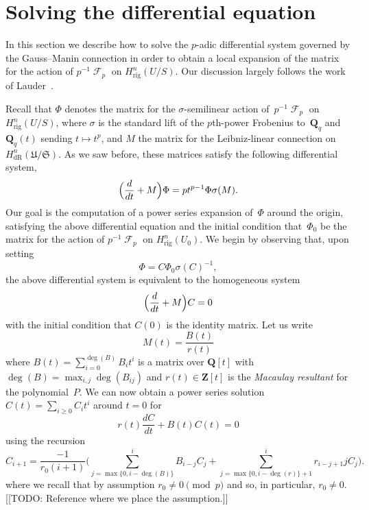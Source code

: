 \documentclass[a4paper,11pt]{article}
\numberwithin{equation}{section}
\DeclareMathOperator{\Frob}{\mathcal{F}} %
\providecommand{\HdR}{H_{\text{dR}}}    %
\providecommand{\Hrig}{H_{\text{rig}}}  %
\theoremstyle{definition}
\begin{document}

\section{Solving the differential equation}
\label{sec:DifferentialSystem}

In this section we describe how to solve the $p$-adic differential 
system governed by the Gauss--Manin connection in order to obtain 
a local expansion of the matrix for the action of $p^{-1} \Frob_p$ 
on $\Hrig^{n}(U/S)$.  Our discussion largely follows the work of 
Lauder~\citep{Lauder2006}.

Recall that $\Phi$ denotes the matrix for the $\sigma$-semilinear action 
of~$p^{-1} \Frob_p$ on $\Hrig^{n}(U/S)$, where $\sigma$ is the standard lift 
of the $p$th-power Frobenius to~$\mathbf{Q}_q$ and~$\mathbf{Q}_q(t)$ sending 
$t \mapsto t^p$, and $M$ the matrix for the Leibniz-linear connection on 
$\HdR^n(\mathfrak{U}/\mathfrak{S})$.
As we saw before, these matrices satisfy the following differential system,
\begin{equation}
\Bigl(\frac{d}{dt} + M\Bigr) \Phi = p t^{p-1} \Phi \sigma(M).
\end{equation}
Our goal is the computation of a power series expansion of~$\Phi$ around 
the origin, satisfying the above differential equation and the initial 
condition that~$\Phi_0$ be the matrix for the action of $p^{-1} \Frob_p$ 
on $\Hrig^n(U_0)$.  We begin by observing that, upon setting 
\begin{equation}
\Phi = C \Phi_0 \sigma(C)^{-1},
\end{equation}
the above differential system is equivalent to the homogeneous system 
\begin{equation} \label{eq:01-GMDE-Homogenous}
\Bigl(\frac{d}{dt} + M\Bigr) C = 0
\end{equation}
with the initial condition that $C(0)$ is the identity matrix.  Let us write 
\begin{equation}
M(t) = \frac{B(t)}{r(t)}
\end{equation}
where $B(t) = \sum_{i=0}^{\deg(B)} B_i t^i$ is a matrix over $\mathbf{Q}[t]$ 
with $\deg(B) = \max_{i,j} \deg(B_{ij})$ and $r(t) \in \mathbf{Z}[t]$ is the 
\emph{Macaulay resultant} for the polynomial~$P$.  We can now obtain a 
power series solution $C(t) = \sum_{i \geq 0} C_i t^i$ around $t=0$ for 
\begin{equation}
r(t) \frac{dC}{dt} + B(t) C(t) = 0
\end{equation}
using the recursion 
\begin{equation}
C_{i+1} = \frac{-1}{r_0 (i+1)} \biggl(
    \sum_{j=\max{\{0,i-\deg(B)\}}}^i B_{i-j} C_j + 
    \sum_{j=\max{\{0,i-\deg(r)\}}+1}^i r_{i-j+1} j C_j \biggr).
\end{equation}
where we recall that by assumption $r_0 \neq 0 \pmod{p}$ and so, 
in particular, $r_0 \neq 0$.  [[TODO:  Reference where we place 
the assumption.]]
\end{document}
